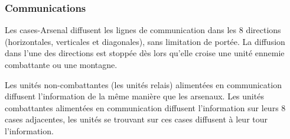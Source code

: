 \documentclass[a4paper]{report}
\begin{document}
\subsubsection*{Communications} \label{communicationRules}
Les cases-Arsenal diffusent les lignes de communication dans les 8 directions (horizontales, verticales et diagonales), sans limitation de portée. La diffusion dans l'une des directions est stoppée dès lors qu'elle croise une unité ennemie combattante ou une montagne.

Les unités non-combattantes (les unités relais) alimentées en communication diffusent l'information de la même manière que les arsenaux. Les unités combattantes alimentées en communication diffusent l'information sur leurs 8 cases adjacentes, les unités se trouvant sur ces cases diffusent à leur tour l'information.
\end{document}
